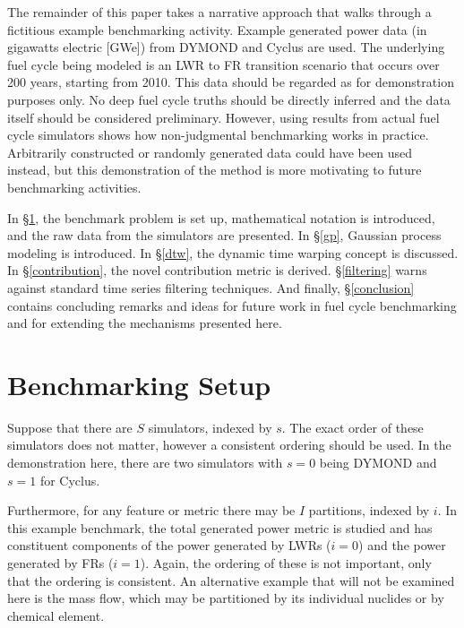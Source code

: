 \documentclass{ntmanuscript}
\begin{document}
The remainder of this paper takes a narrative approach that walks through
a fictitious example benchmarking activity. Example generated power data
(in gigawatts electric [GWe])
from DYMOND \cite{yacout2005modeling,feng2015dymond} and Cyclus
\cite{DBLP:journals/corr/HuffGCFMOSSW15,cyclus_v1_0} are used.
The underlying fuel cycle being modeled is an
LWR to FR transition scenario that occurs over 200 years, starting from 2010.
This data should be regarded as for demonstration purposes only. No deep
fuel cycle truths should be directly inferred and the data itself should be
considered preliminary. However,
using results from actual fuel cycle simulators shows how
non-judgmental benchmarking works in practice. Arbitrarily constructed
or randomly generated data could
have been used instead, but this demonstration of the method is more
motivating to future benchmarking activities.

In \S \ref{setup}, the benchmark problem is set up, mathematical notation is
introduced,
and the raw data from the simulators are presented. In \S \ref{gp}, Gaussian
process
modeling is introduced. In \S \ref{dtw}, the dynamic time warping concept is
discussed. In \S \ref{contribution}, the novel contribution metric is
derived.
\S \ref{filtering} warns against standard time series filtering
techniques. And finally, \S \ref{conclusion} contains concluding remarks
and ideas for future work in fuel cycle benchmarking and for
extending the mechanisms presented here.

\section{Benchmarking Setup}
\label{setup}

Suppose that there are $S$ simulators, indexed by $s$. The exact order
of these simulators does not matter, however a consistent ordering should
be used. In the demonstration here, there are two simulators with $s=0$
being DYMOND and $s=1$ for Cyclus.

Furthermore, for any feature or metric there may be $I$ partitions,
indexed by $i$. In this example benchmark, the total generated power metric
is studied and has constituent components of the power generated by LWRs
($i=0$) and
the power generated by FRs ($i=1$).  Again, the ordering of these is not
important, only that the ordering is consistent. An alternative example
that will not be examined here is the mass flow, which may be partitioned
by its individual nuclides or by chemical element.
\end{document}
